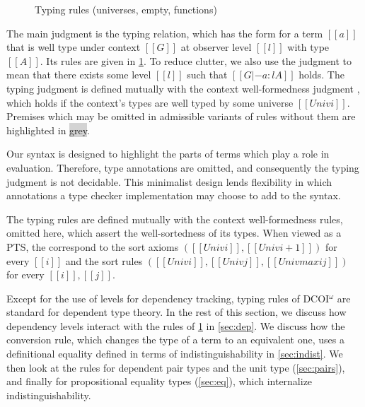 \documentclass[acmsmall, screen=true, nonacm=true,
  review=\ifpublic false\else true\fi,
  anonymous=\ifanonymous true\else false\fi
]{acmart}
\makeatletter
\newcommand{\sw}[1]{}
\newcommand{\name}{\texorpdfstring{DCOI$^{\omega}$\@\xspace}{DCOI-omega}}
\newcommand{\judgement}[1]{{\setlength{\fboxsep}{1.5pt}\fbox{#1}}}
\makeatother
\begin{document}
\begin{figure}[h]
  \caption{Typing rules (universes, empty, functions)}
  \Description{}
  \label{fig:typing:dep}
\end{figure}

The main judgment is the typing relation,
which has the form \judgement{$[[G |- a : l A]]$} for a term $[[a]]$
that is well type under context $[[G]]$ at observer level $[[l]]$
with type $[[A]]$.
Its rules are given in \cref{fig:typing:dep}.
To reduce clutter,
we also use the judgment \judgement{$[[G |- a : A]]$} to mean that there exists some level $[[l]]$
such that $[[G |- a : l A]]$ holds.
The typing judgment is defined mutually with the context well-formedness judgment \judgement{$[[|- G]]$},
which holds if the context's types are well typed by some universe $[[Univ i]]$.
Premises which may be omitted in admissible variants of rules without them
are highlighted in \colorbox{lightgray}{grey}.

Our syntax is designed to highlight the parts of terms which play a role in evaluation.
Therefore, type annotations are omitted,
and consequently the typing judgment is not decidable.
This minimalist design lends flexibility in which annotations
a type checker implementation may choose to add to the syntax.

\sw{We need to say up front that this typing judgment is not designed to be decidable as the 
  syntax does not include enough annotations. We design it this way to highlight the relevant parts of 
the terms. We also have flexibility in where we add annotations, none or relevant so we can add as many or as few as we need depending on how sophisticated we would like the type checking algorithm to be.}

The typing rules are defined mutually with the context well-formedness rules,
omitted here, which assert the well-sortedness of its types.
When viewed as a PTS, the  correspond
to the sort axioms $([[Univ i]], [[Univ i + 1]])$ for every $[[i]]$
and the sort rules $([[Univ i]], [[Univ j]], [[Univ max i j]])$ for every $[[i]], [[j]]$.

Except for the use of levels for dependency tracking, typing rules of \name
are standard for dependent type theory. In the rest of this section, we 
discuss how dependency levels interact with the rules of \cref{fig:typing:dep}
in \cref{sec:dep}. We discuss how the conversion rule, which changes the type of a term to an equivalent one,
uses a definitional equality defined in terms of indistinguishability in \cref{sec:indist}.
We then look at the rules for dependent pair types and the unit type (\cref{sec:pairs}),
and finally for propositional equality types (\cref{sec:eq}),
which internalize indistinguishability.
\end{document}
